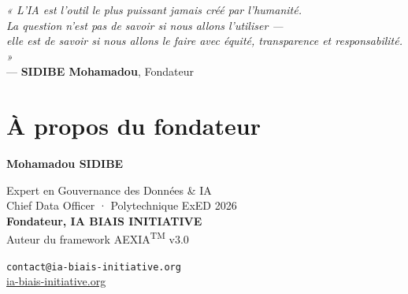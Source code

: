 \documentclass[11pt,a4paper,openany]{book}
\begin{document}
\vspace{0.8cm}

\begin{ctabox}
\begin{center}
{\Large\itshape « L'IA est l'outil le plus puissant jamais créé par l'humanité.\\
La question n'est pas de savoir si nous allons l'utiliser —\\
elle est de savoir si nous allons le faire avec équité, transparence et responsabilité. »}\\[10pt]
{\large — \textbf{SIDIBE Mohamadou}, Fondateur}
\end{center}
\end{ctabox}

\clearpage

\backmatter

\chapter*{À propos du fondateur}

\begin{center}


\vspace{0.5cm}

{\Large\textbf{Mohamadou SIDIBE}}

\vspace{0.3cm}

{\normalsize Expert en Gouvernance des Données \& IA}\\
{\normalsize Chief Data Officer · Polytechnique ExED 2026}\\[4pt]
{\normalsize\textbf{Fondateur, IA BIAIS INITIATIVE}}\\[2pt]
{\normalsize Auteur du framework AEXIA\textsuperscript{TM} v3.0}

\vspace{0.5cm}

{\small\texttt{contact@ia-biais-initiative.org}}\\[2pt]
{\small\href{https://ia-biais-initiative.org}{ia-biais-initiative.org}}

\vspace{0.5cm}


\end{center}
\end{document}
